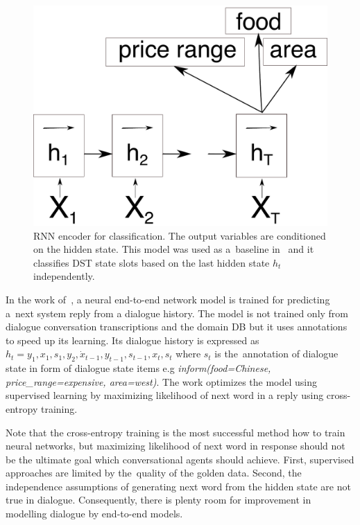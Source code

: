 \documentclass[11pt]{article}
\begin{document}
\begin{figure}[htpb]
    \centering
    \includegraphics[width=0.8\linewidth]{encoder}
    \caption{RNN encoder for classification. The output variables are conditioned on the hidden state. 
    This model was used as a~baseline in~\cite{platek_recurrent_2016} and it classifies DST state slots based on the last hidden state $h_t$ independently.}
\label{fig:encoder}
\end{figure}

In the work of~\cite{wen_networkbased_2016}, a neural end-to-end network model is trained for predicting a~next system reply from a dialogue history.
The model is not trained only from dialogue conversation transcriptions and the domain DB but it uses annotations to speed up its learning.
Its dialogue history is expressed as $h_t = y_1, x_1, s_1, y_2, \dot x_{t-1}, y_{t-1}, s_{t-1}, x_t, s_t $ where $s_t$ is the~annotation of dialogue state in form of dialogue state items e.g {\it inform(food=Chinese, price\_range=expensive, area=west)}.
The work optimizes the model using supervised learning by maximizing likelihood of next word in a reply using cross-entropy training.

Note that the cross-entropy training is the most successful method how to train neural networks, but maximizing likelihood of next word in response should not be the ultimate goal which conversational agents should achieve.
First, supervised approaches are limited by the~quality of the golden data.
Second, the independence assumptions of generating next word from the hidden state are not true in dialogue.
Consequently, there is plenty room for improvement in modelling dialogue by end-to-end models.
\end{document}

